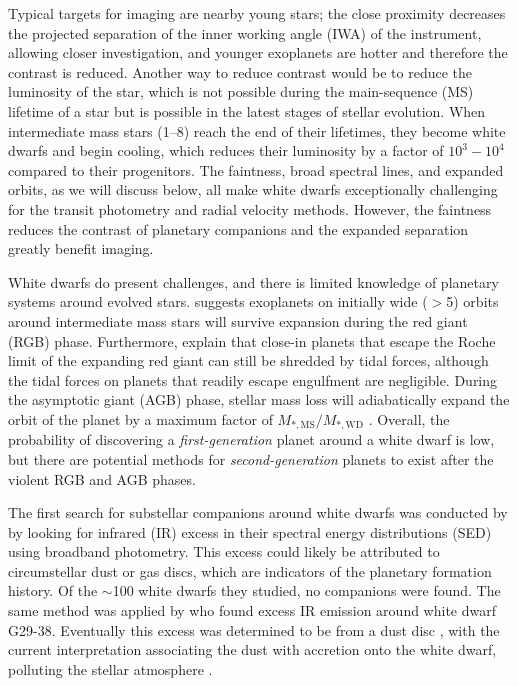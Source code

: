 \documentclass[twocolumn]{aastex631}
\begin{document}
Typical targets for imaging are nearby young stars; the close proximity decreases the projected separation of the inner working angle (IWA) of the instrument, allowing closer investigation, and younger exoplanets are hotter and therefore the contrast is reduced. Another way to reduce contrast would be to reduce the luminosity of the star, which is not possible during the main-sequence (MS) lifetime of a star but is possible in the latest stages of stellar evolution. When intermediate mass stars (\qtyrange{1}{8}{\solarmass}) reach the end of their lifetimes, they become white dwarfs and begin cooling, which reduces their luminosity by a factor of $10^3-10^4$ compared to their progenitors. The faintness, broad spectral lines, and  expanded orbits, as we will discuss below, all make white dwarfs exceptionally challenging for the transit photometry and radial velocity methods. However, the faintness reduces the contrast of planetary companions and the expanded separation greatly benefit imaging.

White dwarfs do present challenges, and there is limited knowledge of planetary systems around evolved stars. \cite{burleigh_imaging_2002,veras_post-main-sequence_2016} suggests exoplanets on initially wide ($>$\qty{5}{\au}) orbits around intermediate mass stars will survive expansion during the red giant (RGB) phase. Furthermore, \citet{nordhaus_orbits_2013} explain that close-in planets that escape the Roche limit of the expanding red giant can still be shredded by tidal forces, although the tidal forces on planets that readily escape engulfment are negligible. During the asymptotic giant (AGB) phase, stellar mass loss will adiabatically expand the orbit of the planet by a maximum factor of $M_{*,\mathrm{MS}}/M_{*,\mathrm{WD}}$ \citep{jeans_cosmogonic_1924}. Overall, the probability of discovering a \textit{first-generation} planet around a white dwarf is low, but there are potential methods for \textit{second-generation} planets to exist after the violent RGB and AGB phases.

The first search for substellar companions around white dwarfs was conducted by \citet{probst_infrared_1983} by looking for infrared (IR) excess in their spectral energy distributions (SED) using broadband photometry. This excess could likely be attributed to circumstellar dust or gas discs, which are indicators of the planetary formation history. Of the $\sim$100 white dwarfs they studied, no companions were found. The same method was applied by \citet{zuckerman_excess_1987} who found excess IR emission around white dwarf G29-38. Eventually this excess was determined to be from a dust disc \citep{telesco_observations_1990}, with the current interpretation associating the dust with accretion onto the white dwarf, polluting the stellar atmosphere \citep{koester_metals_1997}.
\end{document}
